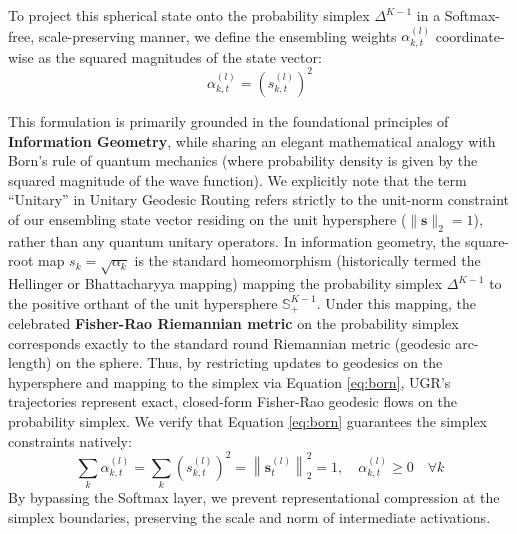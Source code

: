 To project this spherical state onto the probability simplex $\Delta^{K-1}$ in a Softmax-free, scale-preserving manner, we define the ensembling weights $\alpha_{k, t}^{(l)}$ coordinate-wise as the squared magnitudes of the state vector:
\begin{equation}
\alpha_{k, t}^{(l)} = \left(s_{k, t}^{(l)}\right)^2
\label{eq:born}
\end{equation}

This formulation is primarily grounded in the foundational principles of \textbf{Information Geometry}, while sharing an elegant mathematical analogy with Born's rule of quantum mechanics (where probability density is given by the squared magnitude of the wave function). We explicitly note that the term ``Unitary'' in Unitary Geodesic Routing refers strictly to the unit-norm constraint of our ensembling state vector residing on the unit hypersphere ($\|\mathbf{s}\|_2 = 1$), rather than any quantum unitary operators. In information geometry, the square-root map $s_k = \sqrt{\alpha_k}$ is the standard homeomorphism (historically termed the Hellinger or Bhattacharyya mapping) mapping the probability simplex $\Delta^{K-1}$ to the positive orthant of the unit hypersphere $\mathbb{S}^{K-1}_+$. Under this mapping, the celebrated \textbf{Fisher-Rao Riemannian metric} on the probability simplex corresponds exactly to the standard round Riemannian metric (geodesic arc-length) on the sphere. Thus, by restricting updates to geodesics on the hypersphere and mapping to the simplex via Equation \eqref{eq:born}, UGR's trajectories represent exact, closed-form Fisher-Rao geodesic flows on the probability simplex. We verify that Equation \eqref{eq:born} guarantees the simplex constraints natively:
\begin{equation}
\sum_k \alpha_{k, t}^{(l)} = \sum_k \left(s_{k, t}^{(l)}\right)^2 = \left\|\mathbf{s}_t^{(l)}\right\|_2^2 = 1, \quad \alpha_{k, t}^{(l)} \ge 0 \quad \forall k
\end{equation}
By bypassing the Softmax layer, we prevent representational compression at the simplex boundaries, preserving the scale and norm of intermediate activations.

